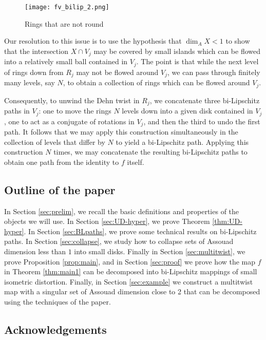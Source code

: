 \documentclass{amsart}
\begin{document}
\begin{figure}[h]
\begin{center}
\texttt{[image: fv\_bilip\_2.png]}
\caption{Rings that are not round}
\label{fig:2}
\end{center}
\end{figure}

Our resolution to this issue is to use the hypothesis that $\dim_A X <1$ to show that the intersection $X \cap V_j$ may be covered by small islands which can be flowed into a relatively small ball contained in $V_j$. The point is that while the next level of rings down from $R_j$ may not be flowed around $V_j$, we can pass through finitely many levels, say $N$, to obtain a collection of rings which can be flowed around $V_j$.

Consequently, to unwind the Dehn twist in $R_j$, we concatenate three bi-Lipschitz paths in $V_j$: one to move the rings $N$ levels down into a given disk contained in $V_j$, one to act as a conjugate of rotations in $V_j$, and then the third to undo the first path. It follows that we may apply this construction simultaneously in the collection of levels that differ by $N$ to yield a bi-Lipschitz path. Applying this construction $N$ times, we may concatenate the resulting bi-Lipschitz paths to obtain one path from the identity to $f$ itself.

\subsection{Outline of the paper}

In Section \ref{sec:prelim}, we recall the basic definitions and properties of the objects we will use. In Section \ref{sec:UD-hyper}, we prove Theorem \ref{thm:UD-hyper}. In Section \ref{sec:BLpaths}, we prove some technical results on bi-Lipschitz paths. In Section \ref{sec:collapse}, we study how to collapse sets of Assouad dimension less than $1$ into small disks. Finally in Section \ref{sec:multitwist}, we prove Proposition \ref{prop:main}, and in Section \ref{sec:proof} we prove how the map $f$ in Theorem \ref{thm:main1} can be decomposed into bi-Lipschitz mappings of small isometric distortion. Finally, in Section \ref{sec:example} we construct a multitwist map with a singular set of Assouad dimension close to 2 that can be decomposed using the techniques of the paper.

\subsection{Acknowledgements}
\end{document}
